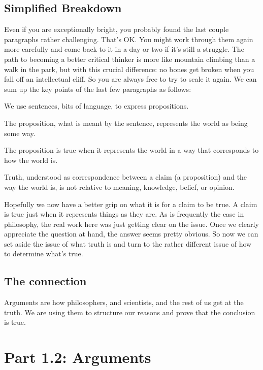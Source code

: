 \subsection{Simplified Breakdown}

Even if you are exceptionally bright, you probably found the last couple paragraphs rather challenging. That’s OK. You might work through them again more carefully and come back to it in a day or two if it’s still a struggle. The path to becoming a better critical thinker is more like mountain climbing than a walk in the park, but with this crucial difference: no bones get broken when you fall off an intellectual cliff. So you are always free to try to scale it again. We can sum up the key points of the last few paragraphs as follows:
\begin{earg}
    \item[] We use sentences, bits of language, to express propositions.
    \item[] The proposition, what is meant by the sentence, represents the world as being some way.
    \item[] The proposition is true when it represents the world in a way that corresponds to how the world is.
    \item[] Truth, understood as correspondence between a claim (a proposition) and the way the world is, is not relative to meaning, knowledge, belief, or opinion.
\end{earg}
Hopefully we now have a better grip on what it is for a claim to be true. A claim is true just when it represents things as they are. As is frequently the case in philosophy, the real work here was just getting clear on the issue. Once we clearly appreciate the question at hand, the answer seems pretty obvious. So now we can set aside the issue of what truth is and turn to the rather different issue of how to determine what’s true.

\subsection{The connection}

Arguments are how philosophers, and scientists, and the rest of us get at the truth. We are using them to structure our reasons and prove that the conclusion is true.

\section{Part 1.2: Arguments}
\label{s:p1.2}


